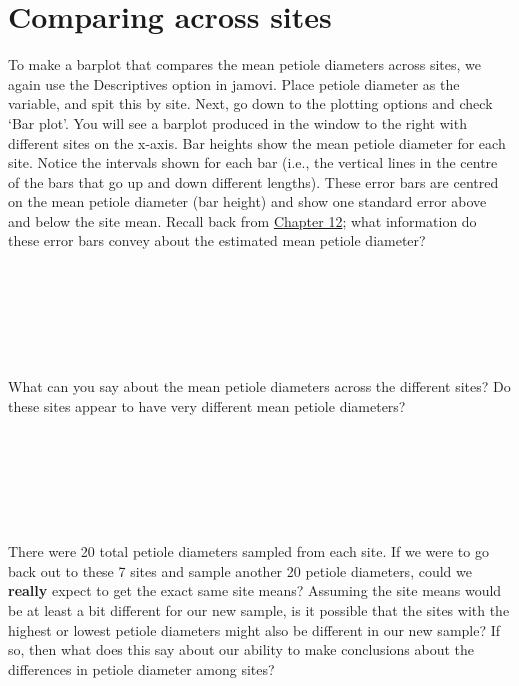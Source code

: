 \documentclass[
  openany]{krantz}
\begin{document}
\hypertarget{comparing-across-sites}{%
\section{Comparing across sites}\label{comparing-across-sites}}

To make a barplot that compares the mean petiole diameters across sites, we again use the Descriptives option in jamovi.
Place petiole diameter as the variable, and spit this by site.
Next, go down to the plotting options and check `Bar plot'.
You will see a barplot produced in the window to the right with different sites on the x-axis.
Bar heights show the mean petiole diameter for each site.
Notice the intervals shown for each bar (i.e., the vertical lines in the centre of the bars that go up and down different lengths).
These error bars are centred on the mean petiole diameter (bar height) and show one standard error above and below the site mean.
Recall back from \protect\hyperlink{Chapter_12}{Chapter 12}; what information do these error bars convey about the estimated mean petiole diameter?

\begin{verbatim}






\end{verbatim}

What can you say about the mean petiole diameters across the different sites?
Do these sites appear to have very different mean petiole diameters?

\begin{verbatim}






\end{verbatim}

There were 20 total petiole diameters sampled from each site.
If we were to go back out to these 7 sites and sample another 20 petiole diameters, could we \textbf{really} expect to get the exact same site means?
Assuming the site means would be at least a bit different for our new sample, is it possible that the sites with the highest or lowest petiole diameters might also be different in our new sample?
If so, then what does this say about our ability to make conclusions about the differences in petiole diameter among sites?

\begin{verbatim}






\end{verbatim}
\end{document}
